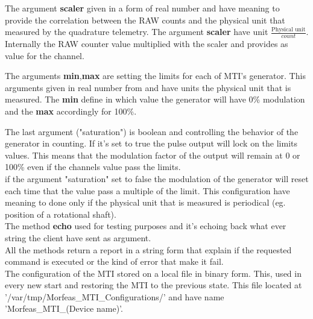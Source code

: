 The argument \textbf{scaler} given in a form of real number and have meaning to provide the correlation between the RAW counts and the physical unit that measured by the quadrature telemetry.
The argument \textbf{scaler} have unit $\displaystyle\frac{\text{Physical unit}}{count}$. Internally the RAW counter value multiplied with the scaler and provides as value for the channel.

The arguments \textbf{min},\textbf{max} are setting the limits for each of MTI's generator. This arguments given in real number from and have units the physical unit that is measured.
The \textbf{min} define in which value the generator will have 0\% modulation and the \textbf{max} accordingly for 100\%.

The last argument ("saturation") is boolean and controlling the behavior of the generator in counting. If it's set to true the pulse output will lock on the limits values.
This means that the modulation factor of the output will remain at 0 or 100\% even if the channels value pass the limits.\\
if the argument "saturation" set to false the modulation of the generator will reset each time that the value pass a multiple of the limit. This configuration have meaning to done
only if the physical unit that is measured is periodical (eg. position of a rotational shaft).\\

The method \textbf{echo} used for testing purposes and it's echoing back what ever string the client have sent as argument.\\

All the methods return a report in a string form that explain if the requested command is executed or the kind of error that make it fail.\\

The configuration of the MTI stored on a local file in binary form. This, used in every new start and restoring the MTI to the previous state.
This file located at '/var/tmp/Morfeas\_MTI\_Configurations/' and have name 'Morfeas\_MTI\_(Device name)'.
